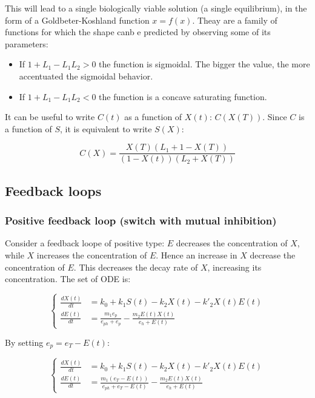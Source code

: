     This will lead to a single biologically viable solution (a single equilibrium), in the form of a Goldbeter-Koshland function $x = f(x)$.
    Theay are a family of functions for which the shape canb e predicted by observing some of its parameters:

    \begin{multicols}{2}
      \begin{itemize}
        \item If $1+ L_1-L_1L_2 > 0$ the function is sigmoidal.
          The bigger the value, the more accentuated the sigmoidal behavior.
        \item If $1+ L_1-L_1L_2 < 0$ the function is a concave saturating function.
      \end{itemize}
    \end{multicols}

    It can be useful to write $C(t)$ as a function of $X(t)$: $C(X(T))$.
    Since $C$ is a function of $S$, it is equivalent to write $S(X)$:

    $$C(X) = \frac{X(T)(L_1+1-X(T))}{(1-X(t))(L_2+X(T))}$$

  \subsection{Feedback loops}

    \subsubsection{Positive feedback loop (switch with mutual inhibition)}
    Consider a feedback loope of positive type: $E$ decreases the concentration of $X$, while $X$ increases the concentration of $E$.
    Hence an increase in $X$ decrease the concentration of $E$.
    This decreases the decay rate of $X$, increasing its concentration.
    The set of ODE is:

    $$\begin{cases}
      \frac{dX(t)}{dt} &= k_0 + k_1S(t) - k_2X(t) - k'_2X(t)E(t)\\
      \frac{dE(t)}{dt} &= \frac{m_1e_p}{e_{ph} + e_p} - \frac{m_2E(t)X(t)}{e_h + E(t)}
    \end{cases}$$

    By setting $e_p = e_T-E(t)$:

    $$\begin{cases}
      \frac{dX(t)}{dt} &= k_0 + k_1S(t) - k_2X(t) - k'_2X(t)E(t)\\
      \frac{dE(t)}{dt} &= \frac{m_1(e_T-E(t))}{e_{ph} + e_T-E(t)} - \frac{m_2E(t)X(t)}{e_h + E(t)}
    \end{cases}$$

